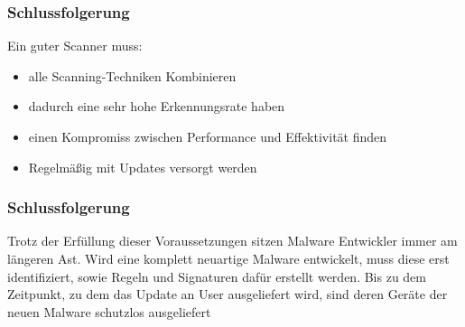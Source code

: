 \documentclass{beamer}
\begin{document}
\begin{frame}
	\frametitle{Schlussfolgerung}
	Ein guter Scanner muss:
	\begin{itemize}
		\item alle Scanning-Techniken Kombinieren
		\item dadurch eine sehr hohe Erkennungsrate haben
		\item einen Kompromiss zwischen Performance und Effektivität finden
		\item Regelmäßig mit Updates versorgt werden
	\end{itemize}
\end{frame}

\begin{frame}
	\frametitle{Schlussfolgerung}
	\begin{block}{}
		Trotz der Erfüllung dieser Voraussetzungen sitzen Malware Entwickler immer am längeren Ast. Wird eine komplett neuartige Malware entwickelt, muss diese erst identifiziert, sowie Regeln und Signaturen dafür erstellt werden. Bis zu dem Zeitpunkt, zu dem das Update an User ausgeliefert wird, sind deren Geräte der neuen Malware schutzlos ausgeliefert
	\end{block}
\end{frame}
\end{document}

